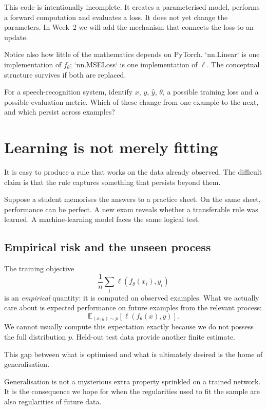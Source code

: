This code is intentionally incomplete. It creates a parameterised model, performs a forward computation and evaluates a loss. It does not yet change the parameters. In Week~2 we will add the mechanism that connects the loss to an update.

Notice also how little of the mathematics depends on PyTorch. `nn.Linear` is one implementation of \(f_\theta\); `nn.MSELoss` is one implementation of \(\ell\). The conceptual structure survives if both are replaced.

\begin{checkpointbox}
For a speech-recognition system, identify \(x\), \(y\), \(\hat y\), \(\theta\), a possible training loss and a possible evaluation metric. Which of these change from one example to the next, and which persist across examples?
\end{checkpointbox}

\section{Learning is not merely fitting}

It is easy to produce a rule that works on the data already observed. The difficult claim is that the rule captures something that persists beyond them.

Suppose a student memorises the answers to a practice sheet. On the same sheet, performance can be perfect. A new exam reveals whether a transferable rule was learned. A machine-learning model faces the same logical test.

\subsection{Empirical risk and the unseen process}

The training objective
\[
  \frac{1}{n}\sum_i \ell(f_\theta(x_i),y_i)
\]
is an \emph{empirical} quantity: it is computed on observed examples. What we actually care about is expected performance on future examples from the relevant process:
\[
  \mathbb{E}_{(x,y)\sim p}
  \left[\ell(f_\theta(x),y)\right].
\]
We cannot usually compute this expectation exactly because we do not possess the full distribution \(p\). Held-out test data provide another finite estimate.

This gap between what is optimised and what is ultimately desired is the home of generalisation.

Generalisation is not a mysterious extra property sprinkled on a trained network. It is the consequence we hope for when the regularities used to fit the sample are also regularities of future data.

